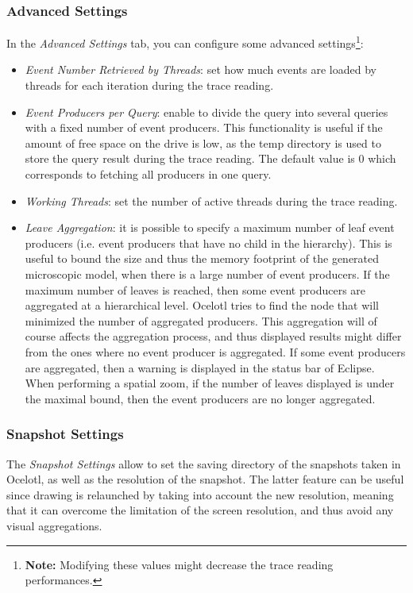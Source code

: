 \documentclass[twoside]{article}
\begin{document}
\begin{sloppypar}
\subsubsection{Advanced Settings}
In the \textit{Advanced Settings} tab, you can configure some advanced settings\footnote{\textbf{Note:} Modifying these values might decrease the trace reading performances.}:
\begin{itemize}
	\item \textit{Event Number Retrieved by Threads}: set how much events are loaded by threads for each iteration during the trace reading.
	\item \textit{Event Producers per Query}: enable to divide the query into several queries with a fixed number of event producers. This functionality is useful if the amount of free space on the drive is low, as the temp directory is used to store the query result during the trace reading. The default value is 0 which corresponds to fetching all producers in one query.
	\item \textit{Working Threads}: set the number of active threads during the trace reading. 
	\item \textit{Leave Aggregation}: it is possible to specify a maximum number of leaf event producers (i.e. event producers that have no child in the hierarchy). This is useful to bound the size and thus the memory footprint of the generated microscopic model, when there is a large number of event producers. If the maximum number of leaves is reached, then some event producers are aggregated at a hierarchical level. Ocelotl tries to find the node that will minimized the number of aggregated producers. This aggregation will of course affects the aggregation process, and thus displayed results might differ from the ones where no event producer is aggregated. If some event producers are aggregated, then a warning is displayed in the status bar of Eclipse. When performing a spatial zoom, if the number of leaves displayed is under the maximal bound, then the event producers are no longer aggregated.
\end{itemize}

\subsubsection{Snapshot Settings}
The \textit{Snapshot Settings} allow to set the saving directory of the snapshots taken in Ocelotl, as well as the resolution of the snapshot. The latter feature can be useful since drawing is relaunched by taking into account the new resolution, meaning that it can overcome the limitation of the screen resolution, and thus avoid any visual aggregations.


\end{sloppypar}
\end{document}
